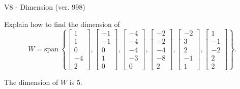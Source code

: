 \begin{exercise}
  \begin{exerciseTitle}V8 - Dimension (ver. 998)\end{exerciseTitle}
  \begin{exerciseStatement}
    Explain how to find the dimension of 
\[W=\mathrm{span}\ \left\{\left[\begin{array}{r}
1 \\
1 \\
0 \\
-4 \\
2
\end{array}\right] , \left[\begin{array}{r}
-1 \\
-1 \\
0 \\
1 \\
0
\end{array}\right] , \left[\begin{array}{r}
-4 \\
-4 \\
-4 \\
-3 \\
0
\end{array}\right] , \left[\begin{array}{r}
-2 \\
-2 \\
-4 \\
-8 \\
2
\end{array}\right] , \left[\begin{array}{r}
-2 \\
3 \\
2 \\
-1 \\
1
\end{array}\right] , \left[\begin{array}{r}
1 \\
-1 \\
-2 \\
2 \\
2
\end{array}\right]\right\}.\]



  \end{exerciseStatement}
  \begin{exerciseAnswer}
   The dimension of \(W\) is  \(5\).
  


  \end{exerciseAnswer}
\end{exercise}